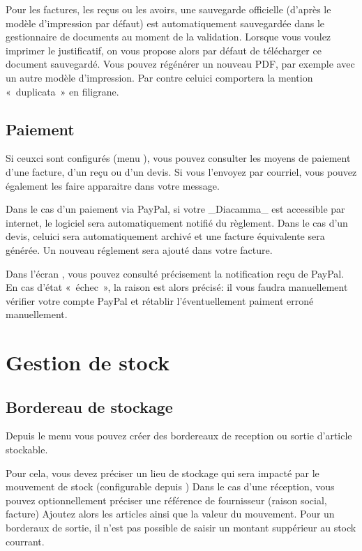 \documentclass[a4paper,10pt,oneside,french]{sphinxmanual}
\begin{document}
Pour les factures, les reçus ou les avoirs, une sauvegarde officielle (d’après le modèle d’impression par défaut) est automatiquement sauvegardée dans le gestionnaire de documents au moment de la validation.
Lorsque vous voulez imprimer le justificatif, on vous propose alors par défaut de télécharger ce document sauvegardé.
Vous pouvez régénérer un nouveau PDF, par exemple avec un autre modèle d’impression. Par contre celui\sphinxhyphen{}ci comportera la mention « duplicata » en filigrane.


\subsection{Paiement}
\label{\detokenize{invoice/create_bill:paiement}}
Si ceux\sphinxhyphen{}ci sont configurés (menu ), vous pouvez consulter les moyens de paiement d’une facture, d’un reçu ou d’un devis.
Si vous l’envoyez par courriel, vous pouvez également les faire apparaitre dans votre message.

Dans le cas d’un paiement via PayPal, si votre \_Diacamma\_ est accessible par internet, le logiciel sera automatiquement notifié du règlement.
Dans le cas d’un devis, celui\sphinxhyphen{}ci sera automatiquement archivé et une facture équivalente sera générée.
Un nouveau réglement sera ajouté dans votre facture.

Dans l’écran , vous pouvez consulté précisement la notification reçu de PayPal.
En cas d’état « échec », la raison est alors précisé: il vous faudra manuellement vérifier votre compte PayPal et rétablir l’éventuellement paiment erroné manuellement.


\section{Gestion de stock}
\label{\detokenize{invoice/stock:gestion-de-stock}}\label{\detokenize{invoice/stock::doc}}

\subsection{Bordereau de stockage}
\label{\detokenize{invoice/stock:bordereau-de-stockage}}
Depuis le menu  vous pouvez créer des bordereaux de reception ou sortie d’article stockable.

Pour cela, vous devez préciser un lieu de stockage qui sera impacté par le mouvement de stock (configurable depuis )
Dans le cas d’une réception, vous pouvez optionnellement préciser une référence de fournisseur (raison social, facture)
Ajoutez alors les articles ainsi que la valeur du mouvement.
Pour un borderaux de sortie, il n’est pas possible de saisir un montant suppérieur au stock courrant.
\end{document}
